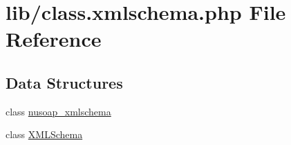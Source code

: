\hypertarget{class_8xmlschema_8php}{}\section{lib/class.xmlschema.\+php File Reference}
\label{class_8xmlschema_8php}
\subsection*{Data Structures}
\begin{DoxyCompactItemize}
\item 
class \hyperlink{classnusoap__xmlschema}{nusoap\+\_\+xmlschema}
\item 
class \hyperlink{class_x_m_l_schema}{X\+M\+L\+Schema}
\end{DoxyCompactItemize}
